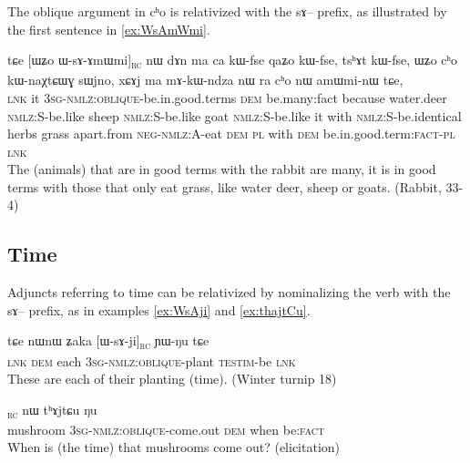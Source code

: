 \documentclass[oldfontcommands,oneside,a4paper,11pt]{article}
\newcommand{\ipa}[1]{{\phon #1}} %
\newcommand{\topic}{\textsc{dem}}
\newcommand{\rc}{\textsubscript{\textsc{rc}}}
\begin{document}
The oblique argument in \ipa{cʰo} is relativized with the \ipa{sɤ}-- prefix, as illustrated by the first sentence in \ref{ex:WsAmWmi}.
\begin{exe}
   \ex \label{ex:WsAmWmi}
 \gll 
\ipa{tɕe}   	[\ipa{ɯʑo}   	\ipa{ɯ-sɤ-ɤmɯmi}]\rc{}   	\ipa{nɯ}   	\ipa{dɤn}   	\ipa{ma}   	\ipa{ca}   	\ipa{kɯ-fse}   	\ipa{qaʑo}   	\ipa{kɯ-fse,}   	\ipa{tsʰɤt}   	\ipa{kɯ-fse,}   	 \ipa{ɯʑo}   	\ipa{cʰo}   	\ipa{kɯ-naχtɕɯɣ}   	\ipa{sɯjno,}   	\ipa{xɕɤj}   	\ipa{ma}   	\ipa{mɤ-kɯ-ndza}   	\ipa{nɯ} \ipa{ra}   	\ipa{cʰo}   	\ipa{nɯ}   	\ipa{amɯmi-nɯ}   	\ipa{tɕe,}   \\
\textsc{lnk} it \textsc{3sg-nmlz:oblique}-be.in.good.terms \topic{} be.many:{fact} because water.deer \textsc{nmlz:S}-be.like sheep \textsc{nmlz:S}-be.like goat  \textsc{nmlz:S}-be.like it with  \textsc{nmlz:S}-be.identical herbs grass apart.from \textsc{neg-nmlz:A}-eat \textsc{dem} \textsc{pl} with \textsc{dem} be.in.good.term:\textsc{fact}-\textsc{pl} \textsc{lnk} \\
\glt The (animals) that are in good terms with the rabbit are many, it is in good terms with those that only eat grass, like water deer, sheep or goats. (Rabbit, 33-4)
\end{exe}

\subsection{Time} \label{sec:rel:time}

Adjuncts referring to   time can be relativized by nominalizing the verb with the \ipa{sɤ}-- prefix, as in examples \ref{ex:WsAji} and \ref{ex:thajtCu}.

\begin{exe}
   \ex \label{ex:WsAji}
   \ipa{tɕe} 	\ipa{nɯnɯ} 	\ipa{ʑaka} 	[\ipa{ɯ-sɤ-ji}]\rc{} 	\ipa{ɲɯ-ŋu} 	\ipa{tɕe} \\
   \textsc{lnk} \textsc{dem} each \textsc{3sg-nmlz:oblique}-plant \textsc{testim}-be \textsc{lnk} \\
\glt These are each of their planting (time). (Winter turnip 18)
\end{exe}

\begin{exe}
   \ex \label{ex:thajtCu}
 \gll [\ipa{tɤjmɤɣ}   	\ipa{ɯ-sɤɣ-ɬoʁ}]\rc{}   	\ipa{nɯ}   	\ipa{tʰɤjtɕu}   	\ipa{ŋu}   \\
 mushroom \textsc{3sg-nmlz:oblique}-come.out \topic{} when be:\textsc{fact} \\
 \glt When is (the time) that mushrooms come out? (elicitation)
\end{exe}
\end{document}
